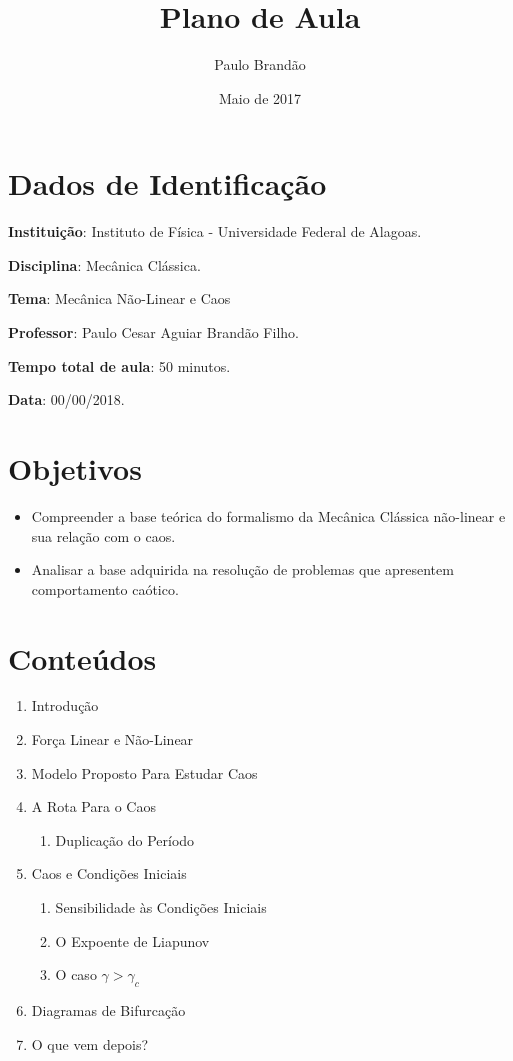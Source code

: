 \documentclass{article}
\title{\Huge\color{astral}\textbf{Plano de Aula}}
\author{Paulo Brandão}
\date{Maio de 2017}
\begin{document}
\maketitle

\section{Dados de Identificação}

\noindent \textbf{Instituição}: Instituto de Física - Universidade Federal de Alagoas.

\noindent \textbf{Disciplina}: Mecânica Clássica.

\noindent \textbf{Tema}: Mecânica Não-Linear e Caos

\noindent \textbf{Professor}: Paulo Cesar Aguiar Brandão Filho.

\noindent \textbf{Tempo total de aula}: 50 minutos.

\noindent \textbf{Data}: 00/00/2018.

\section{Objetivos}

\begin{itemize}
    \item Compreender a base teórica do formalismo da Mecânica Clássica não-linear e sua relação com o caos.
    \item Analisar a base adquirida na resolução de problemas que apresentem comportamento caótico.
\end{itemize}

\section{Conteúdos}

\begin{enumerate}
    \item Introdução
    \item Força Linear e Não-Linear
    \item Modelo Proposto Para Estudar Caos
    \item A Rota Para o Caos
        \begin{enumerate}
            \item Duplicação do Período
        \end{enumerate}
    \item Caos e Condições Iniciais
        \begin{enumerate}
            \item Sensibilidade às Condições Iniciais
            \item O Expoente de Liapunov
            \item O caso $\gamma > \gamma_c$
        \end{enumerate}
    \item Diagramas de Bifurcação
    \item O que vem depois?
\end{enumerate}
\end{document}
